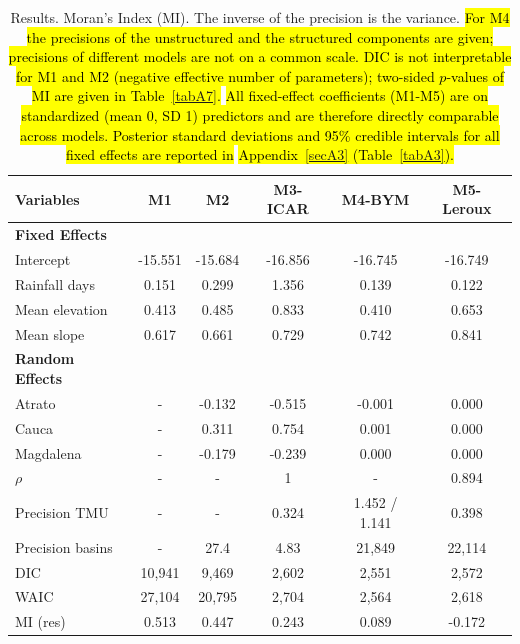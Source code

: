 \documentclass[journal abbreviation, manuscript]{copernicus}
\newcommand{\hlE}[1]{{\sethlcolor{edcyan}\hl{#1}}}
\begin{document}
\begin{table}[h]
\caption{Results. Moran’s Index (MI). The inverse of the precision is the variance. \hlE{For M4 the precisions of the unstructured and the structured components are given; precisions of different models are not on a common scale. DIC is not interpretable for M1 and M2 (negative effective number of parameters); two-sided $p$-values of MI are given in \mbox{Table~\ref{tabA7}}.} \hl{All fixed-effect coefficients (M1-M5) are on standardized (mean 0, SD 1) predictors and are therefore directly comparable across models. Posterior standard deviations and 95\% credible intervals for all fixed effects are reported in} \hlE{\mbox{Appendix~\ref{secA3}} (\mbox{Table~\ref{tabA3}}).}}\label{tab1}
\begin{tabular}{@{}lccccc@{}}
\toprule
Variables & M1 & M2 & M3-ICAR & M4-BYM & M5-Leroux \\
\midrule
\textbf{Fixed Effects} & & & & & \\
\rowcolor{yellow}Intercept & -15.551 & -15.684 & -16.856 & -16.745 & \cellcolor{edcyan}-16.749 \\
\rowcolor{yellow}Rainfall days & 0.151 & 0.299 & 1.356 & 0.139 & \cellcolor{edcyan}0.122 \\
\rowcolor{yellow}Mean elevation & 0.413 & 0.485 & 0.833 & 0.410 & \cellcolor{edcyan}0.653 \\
\rowcolor{yellow}Mean slope & 0.617 & 0.661 & 0.729 & 0.742 & \cellcolor{edcyan}0.841 \\
\textbf{Random Effects} & & & & & \\
\rowcolor{yellow}Atrato & - & -0.132 & -0.515 & -0.001 & 0.000 \\
\rowcolor{yellow}Cauca & - & 0.311 & 0.754 & 0.001 & 0.000 \\
\rowcolor{yellow}Magdalena & - & -0.179 & -0.239 & 0.000 & 0.000 \\
\rowcolor{yellow}$\rho$ & - & - & 1 & - & \cellcolor{edcyan}0.894 \\
\rowcolor{yellow}Precision TMU & - & - & 0.324 & \cellcolor{edcyan}1.452 / 1.141 & 0.398 \\
\rowcolor{yellow}Precision basins & - & 27.4 & 4.83 & \cellcolor{edcyan}21,849 & \cellcolor{edcyan}22,114 \\
\midrule
\rowcolor{yellow}DIC & 10,941 & 9,469 & 2,602 & 2,551 & 2,572 \\
\rowcolor{yellow}WAIC & 27,104 & 20,795 & 2,704 & 2,564 & 2,618 \\
\rowcolor{edcyan}MI (res) & 0.513 & 0.447 & 0.243 & 0.089 & -0.172 \\
\bottomrule
\end{tabular}
\end{table}
\end{document}
